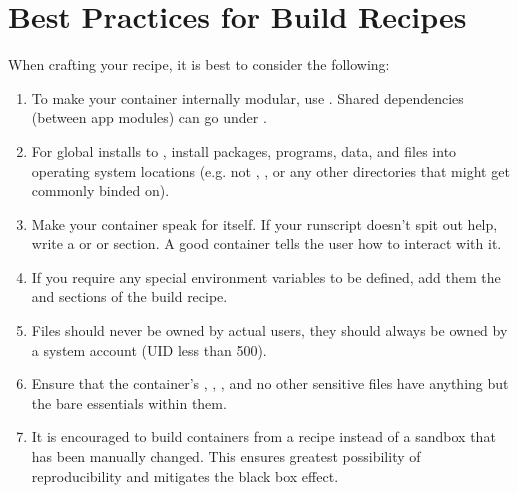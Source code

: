 \documentclass[letterpaper,10pt,english]{sphinxmanual}
\begin{document}
\section{Best Practices for Build Recipes}
\label{\detokenize{container_recipes:best-practices-for-build-recipes}}
When crafting your recipe, it is best to consider the following:
\begin{enumerate}
\item {} 
To make your container internally modular, use {\hyperref[\detokenize{reproducible_scif_apps:reproducible-scif-apps}]{}}. Shared dependencies
(between app modules) can go under .

\item {} 
For global installs to , install packages, programs, data, and files
into operating system locations (e.g. not ,  , or any other
directories that might get commonly binded on).

\item {} 
Make your container speak for itself. If your runscript doesn’t spit
out help, write a  or  or  section. A good container tells the user how
to interact with it.

\item {} 
If you require any special environment variables to be defined, add
them the  and  sections of the build recipe.

\item {} 
Files should never be owned by actual users, they should always be
owned by a system account (UID less than 500).

\item {} 
Ensure that the container’s  ,  ,  , and no other sensitive files have
anything but the bare essentials within them.

\item {} 
It is encouraged to build containers from a recipe instead of a
sandbox that has been manually changed. This ensures greatest
possibility of reproducibility and mitigates the black box effect.

\end{enumerate}
\end{document}
